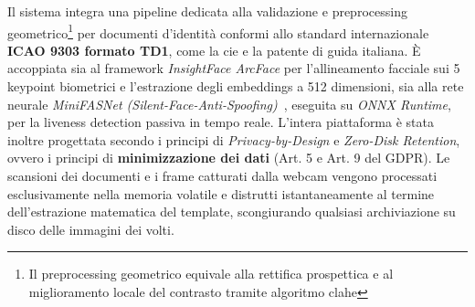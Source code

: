 Il sistema integra una pipeline dedicata alla validazione e preprocessing geometrico\footnote{Il preprocessing geometrico equivale alla rettifica prospettica e al miglioramento locale del contrasto tramite algoritmo \gls{clahe}} per documenti d'identità conformi allo standard internazionale \textbf{ICAO 9303 formato TD1}, come la \gls{cie} e la patente di guida italiana.
È accoppiata sia al framework \textit{InsightFace ArcFace} per l'allineamento facciale sui 5 keypoint biometrici e l'estrazione degli embeddings a 512 dimensioni, sia alla rete neurale \textit{MiniFASNet (Silent-Face-Anti-Spoofing)}~\cite{liSilentFaceAntiSpoofing2024}, eseguita su \textit{ONNX Runtime}, per la liveness detection passiva in tempo reale.
L'intera piattaforma è stata inoltre progettata secondo i principi di \textit{Privacy-by-Design} e \textit{Zero-Disk Retention}, ovvero i principi di \textbf{minimizzazione dei dati} (Art. 5 e Art. 9 del GDPR). Le scansioni dei documenti e i frame catturati dalla webcam vengono processati esclusivamente nella memoria volatile e distrutti istantaneamente al termine dell'estrazione matematica del template, scongiurando qualsiasi archiviazione su disco delle immagini dei volti.